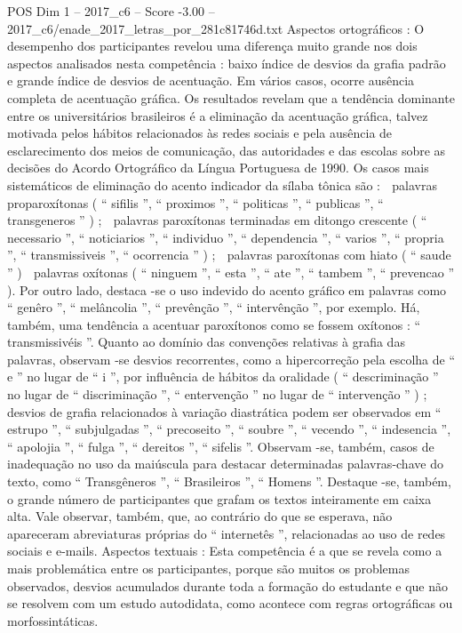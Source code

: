 \begin{textsample}{POS Dim 1 – 2017\_c6 – Score -3.00 – 2017\_c6/enade\_2017\_letras\_por\_281c81746d.txt}
Aspectos ortográficos : O desempenho dos participantes revelou uma diferença muito grande nos dois aspectos analisados nesta competência : baixo índice de desvios da grafia padrão e grande índice de desvios de acentuação.
Em vários casos, ocorre ausência completa de acentuação gráfica.
Os resultados revelam que a tendência dominante entre os universitários brasileiros é a eliminação da acentuação gráfica, talvez motivada pelos hábitos relacionados às redes sociais e pela ausência de esclarecimento dos meios de comunicação, das autoridades e das escolas sobre as decisões do Acordo Ortográfico da Língua Portuguesa de 1990.
Os casos mais sistemáticos de eliminação do acento indicador da sílaba tônica são :  palavras proparoxítonas ( “ sifilis ”, “ proximos ”, “ politicas ”, “ publicas ”, “ transgeneros ” ) ;  palavras paroxítonas terminadas em ditongo crescente ( “ necessario ”, “ noticiarios ”, “ individuo ”, “ dependencia ”, “ varios ”, “ propria ”, “ transmissiveis ”, “ ocorrencia ” ) ;  palavras paroxítonas com hiato ( “ saude ” )  palavras oxítonas ( “ ninguem ”, “ esta ”, “ ate ”, “ tambem ”, “ prevencao ” ).
Por outro lado, destaca -se o uso indevido do acento gráfico em palavras como “ genêro ”, “ melâncolia ”, “ prevênção ”, “ intervênção ”, por exemplo.
Há, também, uma tendência a acentuar paroxítonos como se fossem oxítonos : “ transmissivéis ”.
Quanto ao domínio das convenções relativas à grafia das palavras, observam -se desvios recorrentes, como a hipercorreção pela escolha de “ e ” no lugar de “ i ”, por influência de hábitos da oralidade ( “ descriminação ” no lugar de “ discriminação ”, “ entervenção ” no lugar de “ intervenção ” ) ; desvios de grafia relacionados à variação diastrática podem ser observados em “ estrupo ”, “ subjulgadas ”, “ precoseito ”, “ soubre ”, “ vecendo ”, “ indesencia ”, “ apolojia ”, “ fulga ”, “ dereitos ”, “ sifelis ”.
Observam -se, também, casos de inadequação no uso da maiúscula para destacar determinadas palavras-chave do texto, como “ Transgêneros ”, “ Brasileiros ”, “ Homens ”.
Destaque -se, também, o grande número de participantes que grafam os textos inteiramente em caixa alta.
Vale observar, também, que, ao contrário do que se esperava, não apareceram abreviaturas próprias do “ internetês ”, relacionadas ao uso de redes sociais e e-mails.
Aspectos textuais : Esta competência é a que se revela como a mais problemática entre os participantes, porque são muitos os problemas observados, desvios acumulados durante toda a formação do estudante e que não se resolvem com um estudo autodidata, como acontece com regras ortográficas ou morfossintáticas.

\end{textsample}
